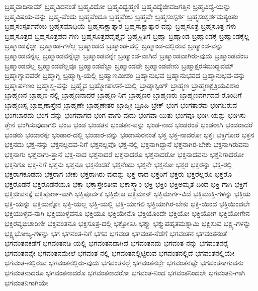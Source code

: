 {ಬ್ರಹ್ಮವಾದಿನಾಮ್
ಬ್ರಹ್ಮವಿದನಂತೆ
ಬ್ರಹ್ಮವಿದೋ
ಬ್ರಹ್ಮವಿದ್ಬ್ರಹ್ಮಣಿ
ಬ್ರಹ್ಮವಿದ್ಯೆಜೀವಜಗತ್ತಿನ
ಬ್ರಹ್ಮವಿದ್ಯೆ-ಯನ್ನು
ಬ್ರಹ್ಮವಿಷಯ-ವನ್ನು
ಬ್ರಹ್ಮ-ವೆಂದು
ಬ್ರಹ್ಮವೆಂದೂ
ಬ್ರಹ್ಮವೆಂಬ
ಬ್ರಹ್ಮವೇ
ಬ್ರಹ್ಮಸಂಸ್ಪರ್ಶ
ಬ್ರಹ್ಮಸಂಸ್ಪರ್ಶಮತ್ಯಂತಂ
ಬ್ರಹ್ಮಸಂಸ್ಪರ್ಶವೆಂಬ
ಬ್ರಹ್ಮಸಮಾಧಿಯೆ
ಬ್ರಹ್ಮಸಾಕ್ಷಾತ್ಕಾರ
ಬ್ರಹ್ಮಸಾಕ್ಷಾತ್ಕಾರ-ವನ್ನು
ಬ್ರಹ್ಮಸೂತ್ರ
ಬ್ರಹ್ಮಸೂತ್ರ-ಗಳು
ಬ್ರಹ್ಮಸೂತ್ರದ
ಬ್ರಹ್ಮಸೂತ್ರಪದ-ಗಳು
ಬ್ರಹ್ಮಸೂತ್ರಪದೈಶ್ಚೈವ
ಬ್ರಹ್ಮಸ್ಥಿತಿಗೆ
ಬ್ರಹ್ಮಾ
ಬ್ರಹ್ಮಾಂಡ
ಬ್ರಹ್ಮಾಂಡಕ್ಕೆ
ಬ್ರಹ್ಮಾಂಡಕ್ಕೆಲ್ಲ
ಬ್ರಹ್ಮಾಂಡಕ್ಕೆಲ್ಲಾ
ಬ್ರಹ್ಮಾಂಡ-ಗಳೆಲ್ಲ
ಬ್ರಹ್ಮಾಂಡದ
ಬ್ರಹ್ಮಾಂಡ-ದಲ್ಲಿ
ಬ್ರಹ್ಮಾಂಡ-ದಲ್ಲಿರುವ
ಬ್ರಹ್ಮಾಂಡ-ವನ್ನು
ಬ್ರಹ್ಮಾಂಡವನ್ನೆಲ್ಲ
ಬ್ರಹ್ಮಾಂಡವನ್ನೆಲ್ಲಾ
ಬ್ರಹ್ಮಾಂಡವನ್ನೇ
ಬ್ರಹ್ಮಾಂಡ-ವಾಗಿದೆ
ಬ್ರಹ್ಮಾಂಡವಾಗಿರು-ವುದು
ಬ್ರಹ್ಮಾಂಡವೆಂಬ
ಬ್ರಹ್ಮಾಂಡವೆಲ್ಲ
ಬ್ರಹ್ಮಾಂಡವೆಲ್ಲವೂ
ಬ್ರಹ್ಮಾಂಡವೆಲ್ಲಾ
ಬ್ರಹ್ಮಾಂಡವೇ
ಬ್ರಹ್ಮಾಂಡವೇನು
ಬ್ರಹ್ಮಾಕ್ಷರಸಮುದ್ಭವಮ್
ಬ್ರಹ್ಮಾಗ್ನಾವಪರೇ
ಬ್ರಹ್ಮಾಗ್ನಿ
ಬ್ರಹ್ಮಾಗ್ನಿ-ಯಲ್ಲಿ
ಬ್ರಹ್ಮಾಣಮೀಶಂ
ಬ್ರಹ್ಮಾನುಭವ
ಬ್ರಹ್ಮಾನುಭವದ
ಬ್ರಹ್ಮಾನುಭವ-ವನ್ನು
ಬ್ರಹ್ಮಾರ್ಪಣಂ
ಬ್ರಹ್ಮಾಸ್ತ್ರ-ವನ್ನು
ಬ್ರಹ್ಮೈವ
ಬ್ರಹ್ಮೋಪಾಸನೆ-ಯಲ್ಲಿ
ಬ್ರಾಡ್ಕಾಸ್ಟಿಂಗ್
ಬ್ರಾಹ್ಮಣ
ಬ್ರಾಹ್ಮಣಕ್ಷತ್ರಿಯವಿಶಾಂ
ಬ್ರಾಹ್ಮಣನ
ಬ್ರಾಹ್ಮಣ-ನಲ್ಲಿ
ಬ್ರಾಹ್ಮಣನಾದರೆ
ಬ್ರಾಹ್ಮಣ-ನಿಗೆ
ಬ್ರಾಹ್ಮಣರ
ಬ್ರಾಹ್ಮಣರು
ಬ್ರಾಹ್ಮಣವರ್ಗದವ-ರೊಂದಿಗೆ
ಬ್ರಾಹ್ಮಣಸ್ಯ
ಬ್ರಾಹ್ಮಣಾಸ್ತೇನ
ಬ್ರಾಹ್ಮಣೇ
ಬ್ರಾಹ್ಮಣೇತರ
ಬ್ರಾಹ್ಮೀ
ಬ್ರೂಹಿ
ಬ್ರೇಕ್
ಭಂಗ
ಭಂಗತಾರವು
ಭಂಗಬರುವ
ಭಂಗಬಾರದು
ಭಂಗ-ವನ್ನು
ಭಂಗವಾಗದ
ಭಂಗ-ವಾಗು-ವುದು
ಭಂಗವಾ-ಯಿತು
ಭಂಗವೂ
ಭಂಗಿ-ಯನ್ನು
ಭಂಗಿಸು-ತ್ತೇನೆ
ಭಂಗಿಸುವುದಾಗಲಿ
ಭಂಟ
ಭಂಡ
ಭಂಡತನ
ಭಂಡತನ-ವನ್ನು
ಭಂಡ-ನಾದ
ಭಂಡರಂತೆ
ಭಂಡರಾಗಿ
ಭಂಡರಾದರೆ
ಭಂಡರು
ಭಂಡಾರಕ್ಕೇ
ಭಂಡಾರ-ದಲ್ಲಿ
ಭಂಡಾರ-ವನ್ನು
ಭಂಡಾಸುರನಂತೆ
ಭಕ್ತ
ಭಕ್ತ-ನಾದರೋ
ಭಕ್ತಃ
ಭಕ್ತಗೋರ
ಭಕ್ತನ
ಭಕ್ತನದು
ಭಕ್ತ-ನನ್ನು
ಭಕ್ತನಲ್ಲದವ-ನಿಗೆ
ಭಕ್ತನಲ್ಲವೊ
ಭಕ್ತ-ನಲ್ಲಿ
ಭಕ್ತನಾಗಿದ್ದಾನೆ
ಭಕ್ತನಾಗಿರ-ಬೇಕು
ಭಕ್ತನಾಗಿರುವನು
ಭಕ್ತನಾಗು
ಭಕ್ತನಾಗು-ತ್ತಾನೆ
ಭಕ್ತ-ನಾದ
ಭಕ್ತನಾದರೆ
ಭಕ್ತನಾದರೊ
ಭಕ್ತನಾದರೋ
ಭಕ್ತನಾದವನು
ಭಕ್ತನಿಗಾದರೋ
ಭಕ್ತನಿಗೂ
ಭಕ್ತ-ನಿಗೆ
ಭಕ್ತನು
ಭಕ್ತನೂ
ಭಕ್ತನೆಂದರೆ
ಭಕ್ತನೆಂದು
ಭಕ್ತನೇ
ಭಕ್ತನೋ
ಭಕ್ತರ
ಭಕ್ತರನ್ನು
ಭಕ್ತ-ರಲ್ಲಿ
ಭಕ್ತರಾಗಕೂಡದು
ಭಕ್ತರಾಗ-ಬೇಕು
ಭಕ್ತರಾಗಿರು-ವುದನ್ನು
ಭಕ್ತ-ರಾದ
ಭಕ್ತರಿಗೆ
ಭಕ್ತರು
ಭಕ್ತರೆಲ್ಲರೂ
ಭಕ್ತರೊ
ಭಕ್ತರೊಡನೆ
ಭಕ್ತರೊಡನೆಯೂ
ಭಕ್ತಾ
ಭಕ್ತಾಸ್ತೇಽತೀವ
ಭಕ್ತಾಸ್ತ್ವಾಂ
ಭಕ್ತಿ
ಭಕ್ತಿಂ
ಭಕ್ತಿಅಮೃತ-ದಿಂದ
ಭಕ್ತಿ-ಗಾಗಿ
ಭಕ್ತಿಗೆ
ಭಕ್ತಿಜೀವನಕ್ಕೆ
ಭಕ್ತಿಪೂರ್ಣ-ವಾಗಿ
ಭಕ್ತಿಪೂರ್ವಕ
ಭಕ್ತಿಬೀಜ
ಭಕ್ತಿಮಾನ್
ಭಕ್ತಿಮಾರ್ಗ-ವಿದೆ
ಭಕ್ತಿಮುಕ್ತಿ-ಗಳನ್ನು
ಭಕ್ತಿಯ
ಭಕ್ತಿ-ಯನ್ನು
ಭಕ್ತಿಯನ್ನೋ
ಭಕ್ತಿ-ಯಲ್ಲ
ಭಕ್ತಿ-ಯಲ್ಲಿ
ಭಕ್ತಿ-ಯಾಗಲಿ
ಭಕ್ತಿಯಾಗಿರ-ಬೇಕು
ಭಕ್ತಿ-ಯಿಂದ
ಭಕ್ತಿಯಿಂದಲೇ
ಭಕ್ತಿಯುಳ್ಳವ-ನಾಗಿ
ಭಕ್ತಿಯುಳ್ಳವನೂ
ಭಕ್ತಿಯೂ
ಭಕ್ತಿಯೇನೊ
ಭಕ್ತಿಯೊಂದೇ
ಭಕ್ತಿಯೋ
ಭಕ್ತಿಯೋಗ
ಭಕ್ತಿಯೋಗೇನ
ಭಕ್ತಿರವ್ಯಭಿಚಾರಿಣೀ
ಭಕ್ತಿವಂತನೂ
ಭಕ್ತಿಸೂತ್ರ-ದಲ್ಲಿ
ಭಕ್ತೋಽಸಿ
ಭಕ್ತ್ಯಾ
ಭಕ್ತ್ಯುಪಹೃತಮಶ್ನಾಮಿ
ಭಕ್ಷಿಸುವ
ಭಕ್ಷ್ಯ-ಗಳನ್ನು
ಭಕ್ಷ್ಯಭೋಜ್ಯ-ಗಳನ್ನು
ಭಗ
ಭಗನಂತ-ನಿಗೆ
ಭಗವ
ಭಗವಂತ
ಭಗವಂತ-ನೆಡೆಗೆ
ಭಗವಂತನ
ಭಗವಂತನಂತೆ
ಭಗವಂತನಕಡೆಗೆ
ಭಗವಂತನಡಿ-ಯಲ್ಲಿ
ಭಗವಂತನದಾಗಿದೆ
ಭಗವಂತನದು
ಭಗವಂತ-ನನ್ನು
ಭಗವಂತನನ್ನೆ
ಭಗವಂತನನ್ನೇ
ಭಗವಂತನಮೇಲೆ
ಭಗವಂತ-ನಲ್ಲಿ
ಭಗವಂತನಲ್ಲಿಟ್ಟಿರುವ
ಭಗವಂತನಲ್ಲಿದೆ
ಭಗವಂತನಲ್ಲಿಯೇ
ಭಗವಂತ-ನಲ್ಲಿರುವ
ಭಗವಂತನಲ್ಲಿರು-ವುದು
ಭಗವಂತನಲ್ಲೆ
ಭಗವಂತನಲ್ಲೇ
ಭಗವಂತನಷ್ಟೇ
ಭಗವಂತನಾಗುವನು
ಭಗವಂತನಾದರೂ
ಭಗವಂತನಾದರೊ
ಭಗವಂತನಾದರೋ
ಭಗವಂತ-ನಿಂದ
ಭಗವಂತನಿಂದಲೇ
ಭಗವಂತನಿ-ಗಾಗಿ
ಭಗವಂತನಿಗಾಗಿಯೇ
}
